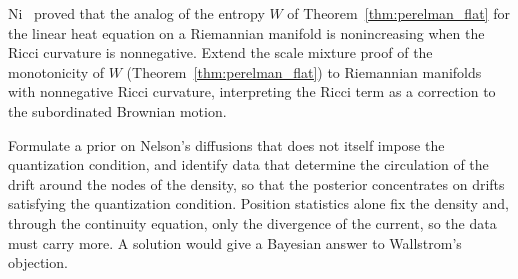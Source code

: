 \begin{problem}[Perelman]\label{prob:perelman}%
Ni~\cite{ni2004} proved that the analog of the entropy $W$ of Theorem~\ref{thm:perelman_flat} for the linear heat equation on a Riemannian manifold is nonincreasing when the Ricci curvature is nonnegative. Extend the scale mixture proof of the monotonicity of $W$ (Theorem~\ref{thm:perelman_flat}) to Riemannian manifolds with nonnegative Ricci curvature, interpreting the Ricci term as a correction to the subordinated Brownian motion.
\end{problem}

\begin{problem}[Quantum]\label{prob:quantum}%
Formulate a prior on Nelson's diffusions that does not itself impose the quantization condition, and identify data that determine the circulation of the drift around the nodes of the density, so that the posterior concentrates on drifts satisfying the quantization condition. Position statistics alone fix the density and, through the continuity equation, only the divergence of the current, so the data must carry more. A solution would give a Bayesian answer to Wallstrom's objection.
\end{problem}


